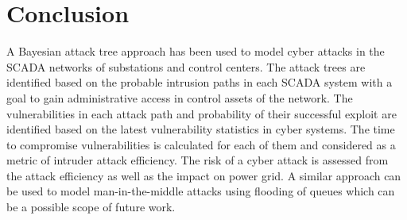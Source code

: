 \section{Conclusion}\label{sec:conclude}
A Bayesian attack tree approach has been used to model cyber attacks in the SCADA networks of substations and control centers. The attack trees are identified based on the probable intrusion paths in each SCADA system with a goal to gain administrative access in control assets of the network. The vulnerabilities in each attack path and probability of their successful exploit are identified based on the latest vulnerability statistics in cyber systems. The time to compromise vulnerabilities is calculated for each of them and considered as a metric of intruder attack efficiency. The risk of a cyber attack is assessed from the attack efficiency as well as the impact on power grid. A similar approach can be used to model man-in-the-middle attacks using flooding of queues which can be a possible scope of future work. 